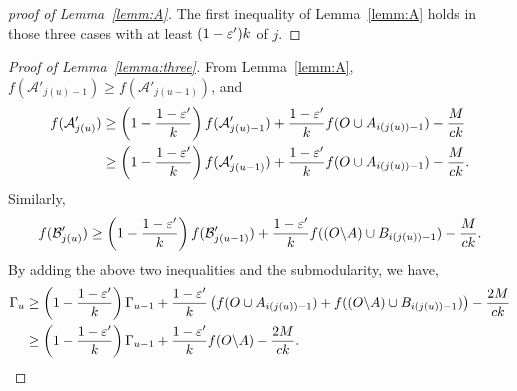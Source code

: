 \begin{proof}[proof of Lemma~\ref{lemm:A}]
  The first inequality of Lemma~\ref{lemm:A} holds in those three cases
  with at least $(1-\varepsilon')k$ of $j$.
\end{proof}

\LemmaC*
\begin{proof}[Proof of Lemma~\ref{lemma:three}]
  From Lemma~\ref{lemm:A}, $f(\mathcal{A'}_{j(u)-1})\ge f(\mathcal{A'}_{j(u-1)})$, and
  \begin{align*}
    f(\mathcal{A}_{j(u)}')& \ge \left(1-\frac{1-\varepsilon'}{k}\right)f(\mathcal{A}_{j(u)-1}')+
    \frac{1-\varepsilon'}{k}f(O\cup A_{i(j(u))-1})-\frac{M}{ck}\\
    &\ge \left(1-\frac{1-\varepsilon'}{k}\right)f(\mathcal{A}_{j(u-1)}')+
    \frac{1-\varepsilon'}{k}f(O\cup A_{i(j(u))-1})-\frac{M}{ck}.
  \end{align*}
  Similarly,
  $$f(\mathcal{B}_{j(u)}')\ge \left(1-\frac{1-\varepsilon'}{k}\right)f(\mathcal{B}_{j(u-1)}')+
  \frac{1-\varepsilon'}{k}f((O\backslash A)\cup B_{i(j(u))-1})-\frac{M}{ck}.$$
  By adding the above two inequalities and the submodularity, we have,
  \begin{align*}
    \Gamma_u&\ge \left(1-\frac{1-\varepsilon'}{k}\right) \Gamma_{u-1}+
    \frac{1-\varepsilon'}{k}\left(f(O\cup A_{i(j(u))-1})+f((O\backslash A)\cup B_{i(j(u))-1})\right)-\frac{2M}{ck}\\
    &\ge \left(1-\frac{1-\varepsilon'}{k}\right) \Gamma_{u-1}+\frac{1-\varepsilon'}{k} f(O\backslash A)-\frac{2M}{ck}.
  \end{align*}
\end{proof}

